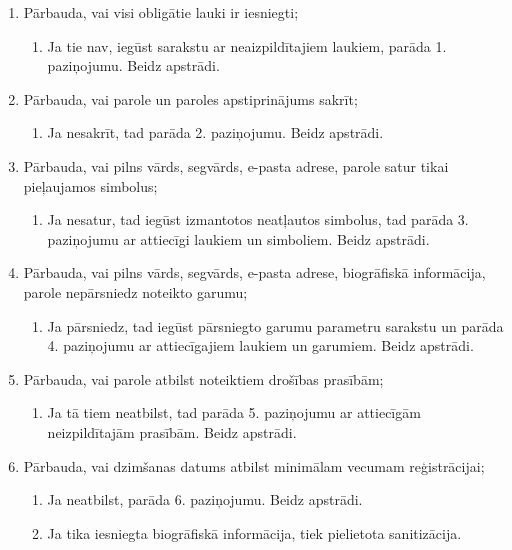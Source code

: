 {
	\begin{enumerate}
		\item Pārbauda, vai visi obligātie lauki ir iesniegti;
		      \begin{enumerate}
			      \item Ja tie nav, iegūst sarakstu ar neaizpildītajiem laukiem, parāda
			            1. paziņojumu. Beidz apstrādi.
		      \end{enumerate}
		\item Pārbauda, vai parole un paroles apstiprinājums sakrīt;
		      \begin{enumerate}
			      \item Ja nesakrīt, tad parāda 2. paziņojumu. Beidz apstrādi.
		      \end{enumerate}
		\item Pārbauda, vai pilns vārds, segvārds, e-pasta adrese, parole satur tikai pieļaujamos simbolus;
		      \begin{enumerate}
			      \item Ja nesatur, tad iegūst izmantotos neatļautos simbolus, tad parāda
			            3. paziņojumu ar attiecīgi laukiem un simboliem. Beidz apstrādi.
		      \end{enumerate}
		\item Pārbauda, vai pilns vārds, segvārds, e-pasta adrese, biogrāfiskā informācija, parole nepārsniedz noteikto garumu;
		      \begin{enumerate}
			      \item Ja pārsniedz, tad iegūst pārsniegto garumu parametru sarakstu un
			            parāda 4. paziņojumu ar attiecīgajiem laukiem un garumiem. Beidz
			            apstrādi.
		      \end{enumerate}
		\item Pārbauda, vai parole atbilst noteiktiem drošības prasībām;
		      \begin{enumerate}
			      \item Ja tā tiem neatbilst, tad parāda 5. paziņojumu ar attiecīgām
			            neizpildītajām prasībām. Beidz apstrādi.
		      \end{enumerate}
		\item Pārbauda, vai dzimšanas datums atbilst minimālam vecumam reģistrācijai;
		      \begin{enumerate}
			      \item Ja neatbilst, parāda 6. paziņojumu. Beidz apstrādi.
			      \item Ja tika iesniegta biogrāfiskā informācija, tiek pielietota sanitizācija.

\end{enumerate}
\end{enumerate}}
